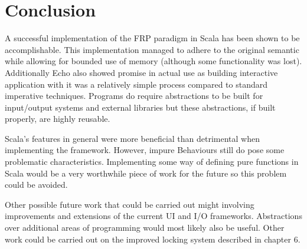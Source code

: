 \chapter{Conclusion}

A successful implementation of the FRP paradigm in Scala has been shown to be accomplishable. This implementation
managed to adhere to the original semantic while allowing for bounded use of memory (although some functionality was
lost). Additionally Echo also showed promise in actual use as building interactive application with it
was a relatively simple process compared to standard imperative techniques. Programs do require abstractions
to be built for input/output systems and external libraries but these abstractions, if built properly, are highly
reusable.

Scala's features in general were more beneficial than detrimental when implementing the framework. However,
impure Behaviours still do pose some problematic characteristics. Implementing some way of defining pure functions
in Scala would be a very worthwhile piece of work for the future so this problem could be avoided.

Other possible future work that could be carried out might involving improvements and extensions of the current UI
and I/O frameworks. Abstractions over additional areas of programming would most likely also be useful. Other work
could be carried out on the improved locking system described in chapter 6.